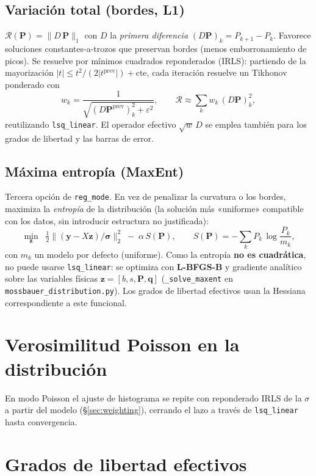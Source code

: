 \documentclass[11pt,a4paper]{article}
\newcommand{\code}[1]{\texttt{\small #1}}
\begin{document}
\subsection{Variación total (bordes, L1)}
$\mathcal R(\bm P)=\lVert D\,\bm P\rVert_1$ con $D$ la \emph{primera diferencia}
$(D\bm P)_k=P_{k+1}-P_k$. Favorece soluciones constantes-a-trozos que preservan
bordes (menos emborronamiento de picos). Se resuelve por mínimos cuadrados
reponderados (IRLS): partiendo de la mayorización
$|t|\le t^2/(2|t^{\text{prev}}|)+\text{cte}$, cada iteración resuelve un Tikhonov
ponderado con
\begin{equation}
  w_k = \frac{1}{\sqrt{(D\bm P^{\text{prev}})_k^2+\varepsilon^2}},
  \qquad \mathcal R\approx \sum_k w_k\,(D\bm P)_k^2,
\end{equation}
reutilizando \code{lsq\_linear}. El operador efectivo $\sqrt{w}\,D$ se emplea
también para los grados de libertad y las barras de error.

\subsection{Máxima entropía (MaxEnt)}
Tercera opción de \code{reg\_mode}. En vez de penalizar la curvatura o los bordes,
maximiza la \emph{entropía} de la distribución (la solución más «uniforme»
compatible con los datos, sin introducir estructura no justificada):
\begin{equation}
  \min_{\bm z}\;\;\tfrac12\bigl\lVert (\bm y-X\bm z)/\bm\sigma\bigr\rVert_2^2
  \;-\; \alpha\,S(\bm P),\qquad
  S(\bm P) = -\sum_k P_k\,\log\!\frac{P_k}{m_k},
\end{equation}
con $m_k$ un modelo por defecto (uniforme). Como la entropía \textbf{no es
cuadrática}, no puede usarse \code{lsq\_linear}: se optimiza con \textbf{L-BFGS-B}
y gradiente analítico sobre las variables físicas $\bm z=[b,s,\bm P,\bm q]$
(\code{\_solve\_maxent} en \code{mossbauer\_distribution.py}). Los grados de
libertad efectivos usan la Hessiana correspondiente a este funcional.

\section{Verosimilitud Poisson en la distribución}
En modo Poisson el ajuste de histograma se repite con reponderado IRLS de la
$\sigma$ a partir del modelo (\S\ref{sec:weighting}), cerrando el lazo a través de
\code{lsq\_linear} hasta convergencia.

\section{Grados de libertad efectivos}\label{sec:effdof}
\end{document}
